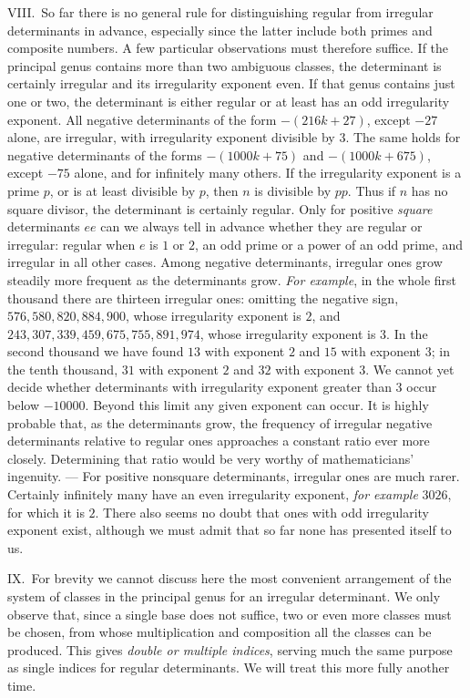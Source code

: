 VIII.\ So far there is no general rule for distinguishing regular from irregular determinants in advance, especially since the latter include both primes and composite numbers. A few particular observations must therefore suffice. If the principal genus contains more than two ambiguous classes, the determinant is certainly irregular and its irregularity exponent even. If that genus contains just one or two, the determinant is either regular or at least has an odd irregularity exponent. All negative determinants of the form \(-(216k+27)\), except \(-27\) alone, are irregular, with irregularity exponent divisible by \(3\). The same holds for negative determinants of the forms \(-(1000k+75)\) and \(-(1000k+675)\), except \(-75\) alone, and for infinitely many others. If the irregularity exponent is a prime \(p\), or is at least divisible by \(p\), then \(n\) is divisible by \(pp\). Thus if \(n\) has no square divisor, the determinant is certainly regular. Only for positive \textit{square} determinants \(ee\) can we always tell in advance whether they are regular or irregular: regular when \(e\) is \(1\) or \(2\), an odd prime or a power of an odd prime, and irregular in all other cases. Among negative determinants, irregular ones grow steadily more frequent as the determinants grow. \textit{For example}, in the whole first thousand there are thirteen irregular ones: omitting the negative sign, \(576,580,820,884,900\), whose irregularity exponent is \(2\), and \(243,307,339,459,675,755,891,974\), whose irregularity exponent is \(3\). In the second thousand we have found \(13\) with exponent \(2\) and \(15\) with exponent \(3\); in the tenth thousand, \(31\) with exponent \(2\) and \(32\) with exponent \(3\). We cannot yet decide whether determinants with irregularity exponent greater than \(3\) occur below \(-10000\). Beyond this limit any given exponent can occur. It is highly probable that, as the determinants grow, the frequency of irregular negative determinants relative to regular ones approaches a constant ratio ever more closely. Determining that ratio would be very worthy of mathematicians' ingenuity. — For positive nonsquare determinants, irregular ones are much rarer. Certainly infinitely many have an even irregularity exponent, \textit{for example} \(3026\), for which it is \(2\). There also seems no doubt that ones with odd irregularity exponent exist, although we must admit that so far none has presented itself to us.

IX.\ For brevity we cannot discuss here the most convenient arrangement of the system of classes in the principal genus for an irregular determinant. We only observe that, since a single base does not suffice, two
or even more classes must be chosen, from whose multiplication and composition all the classes can be produced. This gives \textit{double or multiple indices}, serving much the same purpose as single indices for regular determinants. We will treat this more fully another time.

